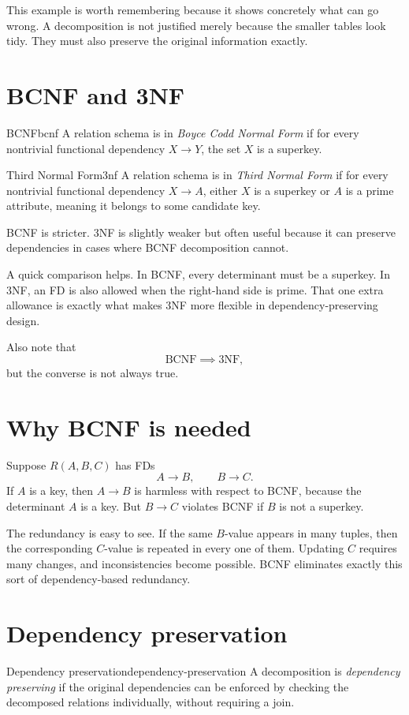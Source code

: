 \documentclass[11pt,a4paper,openany]{book}
\begin{document}
This example is worth remembering because it shows concretely what can go wrong. A decomposition is not justified merely because the smaller tables look tidy. They must also preserve the original information exactly.

\section{BCNF and 3NF}
\begin{definition}{BCNF}{bcnf}
A relation schema is in \emph{Boyce Codd Normal Form} if for every nontrivial functional dependency \(X \to Y\), the set \(X\) is a superkey.
\end{definition}

\begin{definition}{Third Normal Form}{3nf}
A relation schema is in \emph{Third Normal Form} if for every nontrivial functional dependency \(X \to A\), either \(X\) is a superkey or \(A\) is a prime attribute, meaning it belongs to some candidate key.
\end{definition}

BCNF is stricter. 3NF is slightly weaker but often useful because it can preserve dependencies in cases where BCNF decomposition cannot.

A quick comparison helps. In BCNF, every determinant must be a superkey. In 3NF, an FD is also allowed when the right-hand side is prime. That one extra allowance is exactly what makes 3NF more flexible in dependency-preserving design.

Also note that
\[
\text{BCNF} \implies \text{3NF},
\]
but the converse is not always true.

\section{Why BCNF is needed}
Suppose \(R(A,B,C)\) has FDs
\[
A\to B,\qquad B\to C.
\]
If \(A\) is a key, then \(A\to B\) is harmless with respect to BCNF, because the determinant \(A\) is a key. But \(B\to C\) violates BCNF if \(B\) is not a superkey.

The redundancy is easy to see. If the same \(B\)-value appears in many tuples, then the corresponding \(C\)-value is repeated in every one of them. Updating \(C\) requires many changes, and inconsistencies become possible. BCNF eliminates exactly this sort of dependency-based redundancy.

\section{Dependency preservation}
\begin{definition}{Dependency preservation}{dependency-preservation}
A decomposition is \emph{dependency preserving} if the original dependencies can be enforced by checking the decomposed relations individually, without requiring a join.
\end{definition}
\end{document}
